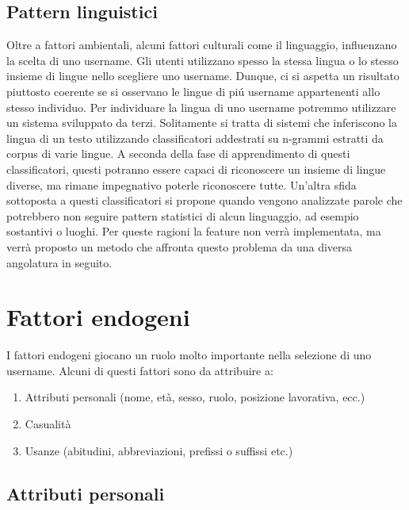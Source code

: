 \subsection{Pattern linguistici}
Oltre a fattori ambientali, alcuni fattori culturali come il linguaggio, influenzano la scelta di uno username. Gli utenti utilizzano spesso la stessa lingua o lo stesso insieme di lingue nello scegliere uno username. Dunque, ci si aspetta un risultato piuttosto coerente se si osservano le lingue di piú username appartenenti allo stesso individuo. Per individuare la lingua di uno username potremmo utilizzare un sistema sviluppato da terzi. Solitamente si tratta di sistemi che inferiscono la lingua di un testo utilizzando classificatori addestrati su n-grammi estratti da corpus di varie lingue. A seconda della fase di apprendimento di questi classificatori, questi potranno essere capaci di riconoscere un insieme di lingue diverse, ma rimane impegnativo poterle riconoscere tutte. Un'altra sfida sottoposta a questi classificatori si propone quando vengono analizzate parole che potrebbero non seguire pattern statistici di alcun linguaggio, ad esempio sostantivi o luoghi. Per queste ragioni la feature non verrà implementata, ma verrà proposto un metodo che affronta questo problema da una diversa angolatura in seguito.


\section{Fattori endogeni}
I fattori endogeni giocano un ruolo molto importante nella selezione di uno username. Alcuni di questi fattori sono da attribuire a:

\begin{enumerate}
  \item Attributi personali (nome, età, sesso, ruolo, posizione lavorativa, ecc.)
  \item Casualità
  \item Usanze (abitudini, abbreviazioni, prefissi o suffissi etc.)
\end{enumerate}

\subsection{Attributi personali}
